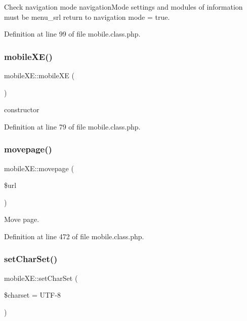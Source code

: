 Check navigation mode navigation\+Mode settings and modules of information must be menu\+\_\+srl return to navigation mode = true. 



Definition at line 99 of file mobile.\+class.\+php.

\mbox{\label{classmobileXE_a5be500c41083816790ef47deed4a66df}} 
\subsubsection{\texorpdfstring{mobile\+X\+E()}{mobileXE()}}
{\footnotesize\ttfamily mobile\+X\+E\+::mobile\+XE (\begin{DoxyParamCaption}{ }\end{DoxyParamCaption})}



constructor 



Definition at line 79 of file mobile.\+class.\+php.

\mbox{\label{classmobileXE_aed0ec3795acddd89572e740d3b31c806}} 
\subsubsection{\texorpdfstring{movepage()}{movepage()}}
{\footnotesize\ttfamily mobile\+X\+E\+::movepage (\begin{DoxyParamCaption}\item[{}]{\$url }\end{DoxyParamCaption})}



Move page. 



Definition at line 472 of file mobile.\+class.\+php.

\mbox{\label{classmobileXE_abcb54cc8b685d1411acbd667e707d030}} 
\subsubsection{\texorpdfstring{set\+Char\+Set()}{setCharSet()}}
{\footnotesize\ttfamily mobile\+X\+E\+::set\+Char\+Set (\begin{DoxyParamCaption}\item[{}]{\$charset = {\ttfamily \textquotesingle{}UTF-\/8\textquotesingle{}} }\end{DoxyParamCaption})}



